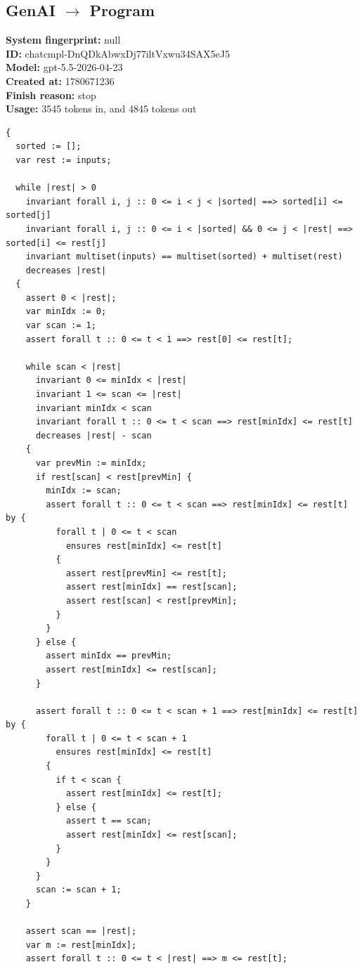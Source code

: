 \documentclass{article}
\begin{document}
\subsection*{GenAI $\rightarrow$ Program}
\textbf{System fingerprint: }null
\\\textbf{ID: }chatcmpl-DnQDkAbwxDj77iltVxwu34SAX5eJ5
\\\textbf{Model: }gpt-5.5-2026-04-23
\\\textbf{Created at: }1780671236
\\\textbf{Finish reason: }stop
\\\textbf{Usage: }3545 tokens in, and 4845 tokens out
\begin{lstlisting}
{
  sorted := [];
  var rest := inputs;

  while |rest| > 0
    invariant forall i, j :: 0 <= i < j < |sorted| ==> sorted[i] <= sorted[j]
    invariant forall i, j :: 0 <= i < |sorted| && 0 <= j < |rest| ==> sorted[i] <= rest[j]
    invariant multiset(inputs) == multiset(sorted) + multiset(rest)
    decreases |rest|
  {
    assert 0 < |rest|;
    var minIdx := 0;
    var scan := 1;
    assert forall t :: 0 <= t < 1 ==> rest[0] <= rest[t];

    while scan < |rest|
      invariant 0 <= minIdx < |rest|
      invariant 1 <= scan <= |rest|
      invariant minIdx < scan
      invariant forall t :: 0 <= t < scan ==> rest[minIdx] <= rest[t]
      decreases |rest| - scan
    {
      var prevMin := minIdx;
      if rest[scan] < rest[prevMin] {
        minIdx := scan;
        assert forall t :: 0 <= t < scan ==> rest[minIdx] <= rest[t] by {
          forall t | 0 <= t < scan
            ensures rest[minIdx] <= rest[t]
          {
            assert rest[prevMin] <= rest[t];
            assert rest[minIdx] == rest[scan];
            assert rest[scan] < rest[prevMin];
          }
        }
      } else {
        assert minIdx == prevMin;
        assert rest[minIdx] <= rest[scan];
      }

      assert forall t :: 0 <= t < scan + 1 ==> rest[minIdx] <= rest[t] by {
        forall t | 0 <= t < scan + 1
          ensures rest[minIdx] <= rest[t]
        {
          if t < scan {
            assert rest[minIdx] <= rest[t];
          } else {
            assert t == scan;
            assert rest[minIdx] <= rest[scan];
          }
        }
      }
      scan := scan + 1;
    }

    assert scan == |rest|;
    var m := rest[minIdx];
    assert forall t :: 0 <= t < |rest| ==> m <= rest[t];


\end{lstlisting}
\end{document}
